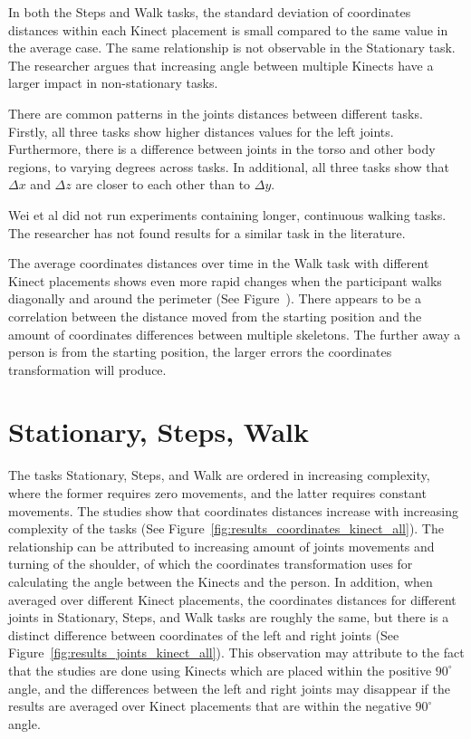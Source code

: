 In both the Steps and Walk tasks, the standard deviation of coordinates distances within each Kinect placement is small compared to the same value in the average case. The same relationship is not observable in the Stationary task. The researcher argues that increasing angle between multiple Kinects have a larger impact in non-stationary tasks.

There are common patterns in the joints distances between different tasks. Firstly, all three tasks show higher distances values for the left joints. Furthermore, there is a difference between joints in the torso and other body regions, to varying degrees across tasks. In additional, all three tasks show that $\Delta x$ and $\Delta z$ are closer to each other than to $\Delta y$.

Wei et al did not run experiments containing longer, continuous walking tasks. The researcher has not found results for a similar task in the literature.

The average coordinates distances over time in the Walk task with different Kinect placements shows even more rapid changes when the participant walks diagonally and around the perimeter (See Figure~). There appears to be a correlation between the distance moved from the starting position and the amount of coordinates differences between multiple skeletons. The further away a person is from the starting position, the larger errors the coordinates transformation will produce.

\section{Stationary, Steps, Walk}
\label{sec:discussion_scenarios}

The tasks Stationary, Steps, and Walk are ordered in increasing complexity, where the former requires zero movements, and the latter requires constant movements. The studies show that coordinates distances increase with increasing complexity of the tasks (See Figure~\ref{fig:results_coordinates_kinect_all}). The relationship can be attributed to increasing amount of joints movements and turning of the shoulder, of which the coordinates transformation uses for calculating the angle between the Kinects and the person. In addition, when averaged over different Kinect placements, the coordinates distances for different joints in Stationary, Steps, and Walk tasks are roughly the same, but there is a distinct difference between coordinates of the left and right joints (See Figure~\ref{fig:results_joints_kinect_all}). This observation may attribute to the fact that the studies are done using Kinects which are placed within the positive $90^{\circ}$ angle, and the differences between the left and right joints may disappear if the results are averaged over Kinect placements that are within the negative $90^{\circ}$ angle.


